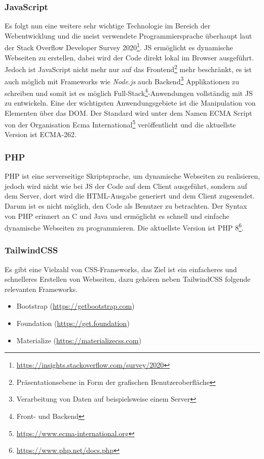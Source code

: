 \subsubsection{JavaScript}
Es folgt nun eine weitere sehr wichtige Technologie im Bereich der
Webentwicklung und die meist verwendete
Programmiersprache überhaupt laut der Stack Overflow Developer Survey
2020\footnote{\url{https://insights.stackoverflow.com/survey/2020}}. \ac*{JS}
ermöglicht es dynamische Webseiten zu erstellen, dabei wird der Code direkt
lokal im Browser ausgeführt. Jedoch ist JavaScript nicht mehr nur auf das
Frontend\footnote{Präsentationsebene in Form der grafischen Benutzeroberfläche}
mehr beschränkt, es ist auch möglich mit Frameworks wie \textit{Node.js} auch
Backend\footnote{Verarbeitung von Daten auf beispielsweise einem Server}
Applikationen zu schreiben und somit ist es möglich Full-Stack\footnote{Front-
und Backend}-Anwendungen vollständig mit \acl*{JS} zu entwickeln. Eine der
wichtigsten Anwendungsgebiete ist die Manipulation von Elementen über das
\ac*{DOM}. Der Standard wird unter dem Namen ECMA Script von der Organisation
Ecma International\footnote{\url{https://www.ecma-international.org}}
veröffentlicht und die aktuellste Version ist ECMA-262.

\subsubsection{PHP}
\ac*{PHP} ist eine serverseitige Skriptsprache, um dynamische Webseiten zu realisieren, jedoch
wird nicht wie bei \acl*{JS} der Code auf dem Client ausgeführt, sondern auf dem
Server, dort wird die HTML-Ausgabe generiert und dem Client zugesendet. Darum
ist es nicht möglich, den Code als Benutzer zu betrachten. Der Syntax von PHP
erinnert an C und Java und ermöglicht es schnell und einfache dynamische
Webseiten zu programmieren. Die aktuellste Version ist
\acs*{PHP} 8\footnote{\url{https://www.php.net/docs.php}}.


\subsubsection{TailwindCSS}
Es gibt eine Vielzahl von CSS-Frameworks, das Ziel ist ein einfacheres und
schnelleres Erstellen von Webseiten, dazu gehören neben TailwindCSS folgende
relevanten Frameworks.

\begin{itemize}
  \item Bootstrap (\url{https://getbootstrap.com})
  \item Foundation (\url{https://get.foundation})
  \item Materialize (\url{https://materializecss.com})
\end{itemize}

